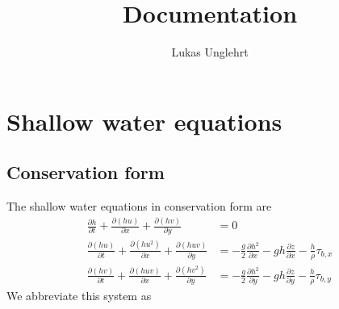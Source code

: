 \documentclass[10pt,a4paper]{article}
\author{Lukas Unglehrt}
\title{Documentation}
\begin{document}
	\maketitle
	
	\section{Shallow water equations}
	\subsection{Conservation form}
	The shallow water equations in conservation form are
	\begin{subequations}
		\begin{align}
		\frac{\partial h}{\partial t} + \frac{\partial (h u)}{\partial x} + \frac{\partial (h v)}{\partial y}&=0 \\
		\frac{\partial (h u)}{\partial t} +\frac{\partial (h u^2)}{\partial x} + \frac{\partial (h u v)}{\partial y}&= -\frac{g}{2}\frac{\partial h^2}{\partial x}-g h \frac{\partial z}{\partial x} - \frac{h}{\rho}\tau_{b,x} \\
		\frac{\partial (h v)}{\partial t} +\frac{\partial (h u v)}{\partial x} + \frac{\partial (h v^2)}{\partial y}&= -\frac{g}{2}\frac{\partial h^2}{\partial y}-g h \frac{\partial z}{\partial y} - \frac{h}{\rho}\tau_{b,y}
		\end{align}
	\end{subequations}
	We abbreviate this system as
\end{document}
